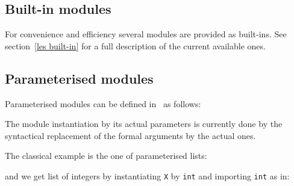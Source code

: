 \subsection{Built-in modules}

For convenience and efficiency several modules are provided as
built-ins. See section~\ref{les built-in} for a full description of
the current available ones.


\subsection{Parameterised modules}

Parameterised modules can be defined in \elan\ as follows:


The module instantiation by its actual parameters is currently done by
the syntactical replacement of the formal arguments by the actual ones.

\EX The classical example is the one of parameterised lists:\\

\noindent
and we get list of integers by 
instantiating {\tt X} by {\tt int} and importing {\tt int} as in:\\
\FEX

